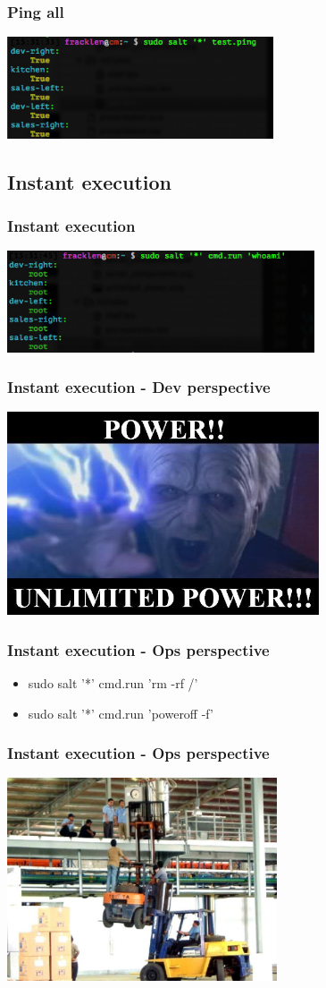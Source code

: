 \frame
{
  \frametitle{Ping all}

  \begin{center}%
    \includegraphics[height=3cm]{images/salt_ping.png}
  \end{center}%
}

\subsection{Instant execution}
\frame
{
  \frametitle{Instant execution}

  \begin{center}%
    \includegraphics[height=3cm]{images/salt_cmd.png}
  \end{center}%
}

\frame
{
  \frametitle{Instant execution - Dev perspective}

  \begin{center}%
    \includegraphics[height=6cm]{images/unlimited_power.png}
  \end{center}%
}

\frame
{
  \frametitle{Instant execution - Ops perspective}

  \begin{itemize}
  \item<1-> sudo salt '*' cmd.run 'rm -rf /'
  \item<2-> sudo salt '*' cmd.run 'poweroff -f'
  \end{itemize}
}

\frame
{
  \frametitle{Instant execution - Ops perspective}

  \begin{center}%
    \includegraphics[height=6cm]{images/accident.png}
  \end{center}%
}


